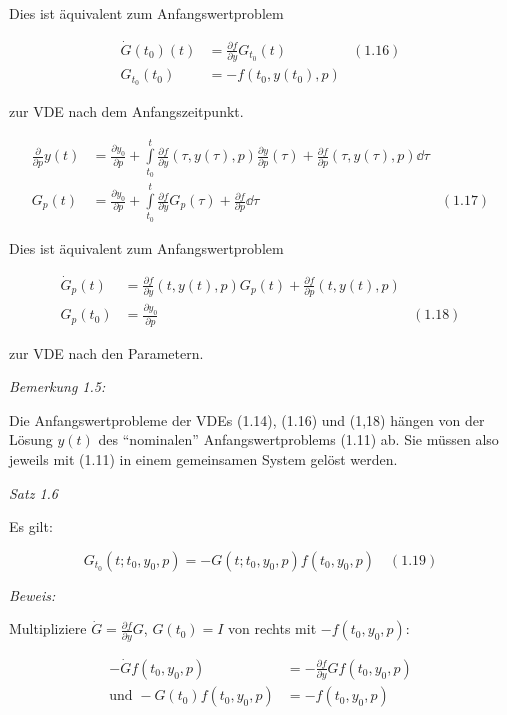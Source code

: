 Dies ist äquivalent zum Anfangswertproblem

\begin{align*}
\dot G(t_0) (t) &= \frac{\partial f}{\partial y} G_{t_0} (t) & (1.16) \\
G_{t_0} (t_0) &= -f(t_0, y(t_0), p) 
\end{align*}

zur VDE nach dem Anfangszeitpunkt.


\begin{align*}
\frac \partial{\partial p} y(t) &= \frac{\partial y_0}{\partial p} + \int\limits_{t_0}^t \frac{\partial f}{\partial y} (\tau, y(\tau), p) \frac{\partial y}{\partial p} (\tau) + \frac{\partial f}{\partial p} (\tau, y(\tau), p) \dd \tau \\
G_p(t) &= \frac{\partial y_0}{\partial p} + \int\limits_{t_0}^t \frac{\partial f}{\partial y} G_p(\tau) + \frac{\partial f}{\partial p} \dd \tau & (1.17)
\end{align*}

Dies ist äquivalent zum Anfangswertproblem

\begin{align*}
\dot G_p(t) &= \frac{\partial f}{\partial y} (t,y(t),p) G_p(t) + \frac{\partial f}{\partial p} (t, y(t), p) \\
G_p(t_0) &= \frac{\partial y_0}{\partial p} & (1.18)
\end{align*}

zur VDE nach den Parametern.

\emph{Bemerkung 1.5:}

Die Anfangswertprobleme der VDEs (1.14), (1.16) und (1,18) hängen von der Lösung $y(t)$ des "`nominalen"' Anfangswertproblems (1.11) ab. Sie müssen also jeweils mit (1.11) in einem gemeinsamen System gelöst werden.

\emph{Satz 1.6}

Es gilt:

\[ G_{t_0} (t; t_0, y_0, p) = -G(t; t_0, y_0, p) f(t_0, y_0, p) \quad (1.19) \]

\emph{Beweis:}

Multipliziere $\dot G = \tfrac{\partial f}{\partial y} G$, $G(t_0) = I$ von rechts mit $-f(t_0, y_0, p):$

\begin{align*}
-\dot G f(t_0,y_0,p) &= -\frac{\partial f}{\partial y} G f(t_0, y_0, p) \\
\text{und } -G(t_0) f(t_0, y_0, p) &= -f(t_0, y_0, p)
\end{align*}

